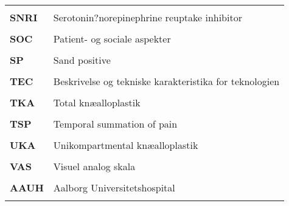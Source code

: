 \begin{longtable}{p{}  p{}}
\\ \\
\textbf{SNRI}& Serotonin?norepinephrine reuptake inhibitor              
\\ \\
\textbf{SOC} & Patient- og sociale aspekter                             
\\ \\
\textbf{SP}  & Sand positive                                            
\\ \\
\textbf{TEC} & Beskrivelse og tekniske karakteristika for teknologien   
\\ \\
\textbf{TKA} & Total knæalloplastik                                     
\\ \\
\textbf{TSP} & Temporal summation of pain                               
\\ \\
\textbf{UKA} & Unikompartmental knæalloplastik                          
\\ \\
\textbf{VAS} & Visuel analog skala                                      
\\ \\
\textbf{AAUH}& Aalborg Universitetshospital                             
\\ \\
\end{longtable}
